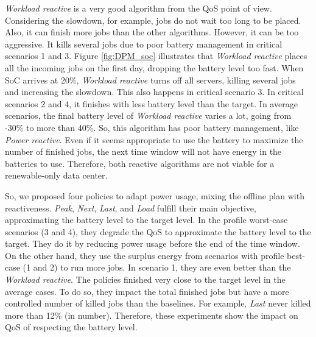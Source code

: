 \emph{Workload reactive} is a very good algorithm from the QoS point of view. Considering the slowdown, for example, jobs do not wait too long to be placed. Also, it can finish more jobs than the other algorithms. However, it can be too aggressive. It kills several jobs due to poor battery management in critical scenarios 1 and 3. Figure \ref{fig:DPM_soc} illustrates that \emph{Workload reactive} places all the incoming jobs on the first day, dropping the battery level too fast. When SoC arrives at 20\%, \emph{Workload reactive} turns off all servers, killing several jobs and increasing the slowdown. This also happens in critical scenario 3. In critical scenarios 2 and 4, it finishes with less battery level than the target. In average scenarios, the final battery level of \emph{Workload reactive} varies a lot, going from -30\% to more than 40\%. So, this algorithm has poor battery management, like \emph{Power reactive}. Even if it seems appropriate to use the battery to maximize the number of finished jobs, the next time window will not have energy in the batteries to use. Therefore, both reactive algorithms are not viable for a renewable-only data center.

So, we proposed four policies to adapt power usage, mixing the offline plan with reactiveness. \emph{Peak}, \emph{Next}, \emph{Last}, and \emph{Load} fulfill their main objective, approximating the battery level to the target level. In the profile worst-case scenarios (3 and 4), they degrade the QoS to approximate the battery level to the target. They do it by reducing power usage before the end of the time window. On the other hand, they use the surplus energy from scenarios with profile best-case (1 and 2) to run more jobs. In scenario 1, they are even better than the \emph{Workload reactive}. The policies finished very close to the target level in the average cases. To do so, they impact the total finished jobs but have a more controlled number of killed jobs than the baselines. For example, \emph{Last} never killed more than 12\% (in number). Therefore, these experiments show the impact on QoS of respecting the battery level.

